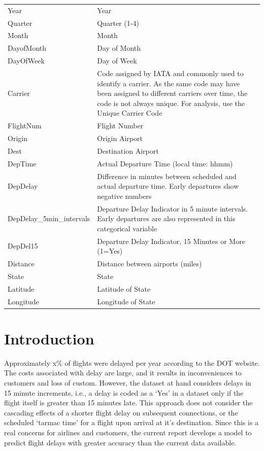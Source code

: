 \documentclass[a4paper, 10pt]{article}
\begin{document}
\begin{tabular}{l p{11cm}  }
Year& Year\\
Quarter& Quarter (1-4)\\
Month& Month\\
DayofMonth& Day of Month\\
DayOfWeek& Day of Week\\
Carrier& Code assigned by IATA and commonly used to identify a carrier. As the same code may have been assigned to different carriers over time, the code is not always unique. For analysis, use the Unique Carrier Code\\
FlightNum& Flight Number\\
Origin& Origin Airport\\
Dest& Destination Airport\\
DepTime& Actual Departure Time (local time: hhmm)\\
DepDelay& Difference in minutes between scheduled and actual departure time. Early departures show negative numbers\\
DepDelay\_5min\_intervals & Departure Delay Indicator in 5 minute intervals. Early departures are also represented in this categorical variable\\
DepDel15& Departure Delay Indicator, 15 Minutes or More (1=Yes)\\
Distance& Distance between airports (miles)\\
State & State\\
Latitude & Latitude of State\\
Longitude & Longitude of State\\
\end{tabular}

\clearpage

\section{Introduction}\label{intro}

Approximately x\% of flights were delayed per year according to the DOT website. The costs associated with delay are large, and it results in inconveniences to customers and loss of custom. However, the dataset at hand considers delays in 15 minute increments, i.e., a delay is coded as a `Yes' in a dataset only if the flight itself is greater than 15 minutes late. This approach does not consider the cascading effects of a shorter flight delay on subsequent connections, or the scheduled `tarmac time' for a flight upon arrival at it's destination. Since this is a real concerns for airlines and customers, the current report develops a model to predict flight delays with greater accuracy than the current data available. 
\end{document}

